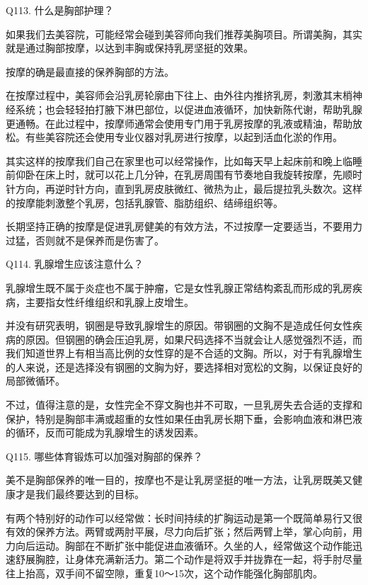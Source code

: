 \documentclass[12pt,UTF8]{ctexbook}
\begin{document}
Q113. 什么是胸部护理？


如果我们去美容院，可能经常会碰到美容师向我们推荐美胸项目。所谓美胸，其实就是通过胸部按摩，以达到丰胸或保持乳房坚挺的效果。

按摩的确是最直接的保养胸部的方法。

在按摩过程中，美容师会沿乳房轮廓由下往上、由外往内推挤乳房，刺激其末梢神经系统；也会轻轻拍打腋下淋巴部位，以促进血液循环，加快新陈代谢，帮助乳腺更通畅。在此过程中，按摩师通常会使用专门用于乳房按摩的乳液或精油，帮助放松。有些美容院还会使用专业仪器对乳房进行按摩，以起到活血化淤的作用。

其实这样的按摩我们自己在家里也可以经常操作，比如每天早上起床前和晚上临睡前仰卧在床上时，就可以花上几分钟，在乳房周围有节奏地自我旋转按摩，先顺时针方向，再逆时针方向，直到乳房皮肤微红、微热为止，最后提拉乳头数次。这样的按摩能刺激整个乳房，包括乳腺管、脂肪组织、结缔组织等。

长期坚持正确的按摩是促进乳房健美的有效方法，不过按摩一定要适当，不要用力过猛，否则就不是保养而是伤害了。





Q114. 乳腺增生应该注意什么？


乳腺增生既不属于炎症也不属于肿瘤，它是女性乳腺正常结构紊乱而形成的乳房疾病，主要指女性纤维组织和乳腺上皮增生。

并没有研究表明，钢圈是导致乳腺增生的原因。带钢圈的文胸不是造成任何女性疾病的原因。但钢圈的确会压迫乳房，如果尺码选择不当就会让人感觉强烈不适，而我们知道世界上有相当高比例的女性穿的是不合适的文胸。所以，对于有乳腺增生的人来说，还是选择没有钢圈的文胸为好，要选择相对宽松的文胸，以保证良好的局部微循环。

不过，值得注意的是，女性完全不穿文胸也并不可取，一旦乳房失去合适的支撑和保护，特别是胸部丰满或超重的女性如果任由乳房长期下垂，会影响血液和淋巴液的循环，反而可能成为乳腺增生的诱发因素。





Q115. 哪些体育锻炼可以加强对胸部的保养？


美不是胸部保养的唯一目的，按摩也不是让乳房坚挺的唯一方法，让乳房既美又健康才是我们最终要达到的目标。

有两个特别好的动作可以经常做：长时间持续的扩胸运动是第一个既简单易行又很有效的保养方法。两臂或两肘平展，尽力向后扩张；然后两臂上举，掌心向前，用力向后运动。胸部在不断扩张中能促进血液循环。久坐的人，经常做这个动作能迅速舒展胸腔，让身体充满新活力。第二个动作是将双手并拢靠在一起，将手肘尽量往上抬高，双手间不留空隙，重复10～15次，这个动作能强化胸部肌肉。
\end{document}

